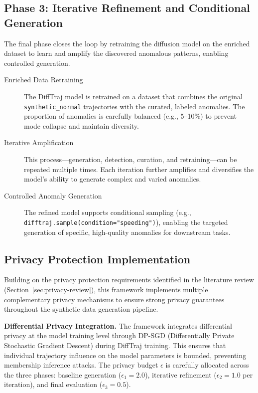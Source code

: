 \documentclass[runningheads]{llncs}
\begin{document}
\subsection{Phase 3: Iterative Refinement and Conditional Generation}
\label{sec:iterative-refinement}

The final phase closes the loop by retraining the diffusion model on the enriched dataset to learn and amplify the discovered anomalous patterns, enabling controlled generation.

\begin{description}
    \item[Enriched Data Retraining] The DiffTraj model is retrained on a dataset that combines the original \texttt{synthetic\_normal} trajectories with the curated, labeled anomalies. The proportion of anomalies is carefully balanced (e.g., 5--10\%) to prevent mode collapse and maintain diversity.
    \item[Iterative Amplification] This process---generation, detection, curation, and retraining---can be repeated multiple times. Each iteration further amplifies and diversifies the model's ability to generate complex and varied anomalies.
    \item[Controlled Anomaly Generation] The refined model supports conditional sampling (e.g., \texttt{difftraj.sample(condition="speeding")}), enabling the targeted generation of specific, high-quality anomalies for downstream tasks.
\end{description}

\subsection{Privacy Protection Implementation}
\label{sec:privacy-implementation}

Building on the privacy protection requirements identified in the literature review (Section~\ref{sec:privacy-review}), this framework implements multiple complementary privacy mechanisms to ensure strong privacy guarantees throughout the synthetic data generation pipeline.

\textbf{Differential Privacy Integration.} The framework integrates differential privacy at the model training level through DP-SGD (Differentially Private Stochastic Gradient Descent) during DiffTraj training. This ensures that individual trajectory influence on the model parameters is bounded, preventing membership inference attacks. The privacy budget $\epsilon$ is carefully allocated across the three phases: baseline generation ($\epsilon_1 = 2.0$), iterative refinement ($\epsilon_2 = 1.0$ per iteration), and final evaluation ($\epsilon_3 = 0.5$).
\end{document}
